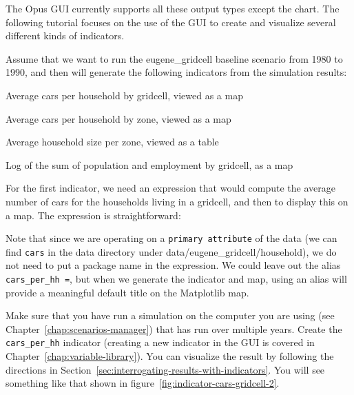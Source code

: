 The Opus GUI currently supports all these output types except the
chart. The following tutorial focuses on the use of the GUI to
create and visualize several different kinds of indicators.

Assume that we want to run the eugene\_gridcell baseline scenario from
1980 to 1990, and then will generate the following indicators from the
simulation results:

\squishlist
\item Average cars per household by gridcell, viewed as a map
\item Average cars per household by zone, viewed as a map
\item Average household size per zone, viewed as a table
\item Log of the sum of population and employment by gridcell, as a map
\squishend

For the first indicator, we need an expression that would compute the
average number of cars for the households living in a gridcell, and
then to display this on a map.  The expression is straightforward:


Note that since we are operating on a \verb#primary attribute# of the
data (we can find \verb#cars# in the data directory under
data/eugene\_gridcell/household), we do not need to put a package name
in the expression.  We could leave out the alias \verb#cars_per_hh =#,
but when we generate the indicator and map, using an alias will provide
a meaningful default title on the Matplotlib map.

Make sure that you have run a
simulation on the computer you are using (see
Chapter~\ref{chap:scenarios-manager}) that has run over multiple
years. Create the \verb#cars_per_hh# indicator (creating a new
indicator in the GUI is covered in
Chapter~\ref{chap:variable-library}). You can visualize the result
by following the directions in
Section~\ref{sec:interrogating-results-with-indicators}. You
will see something like that shown in
figure~\ref{fig:indicator-cars-gridcell-2}.


